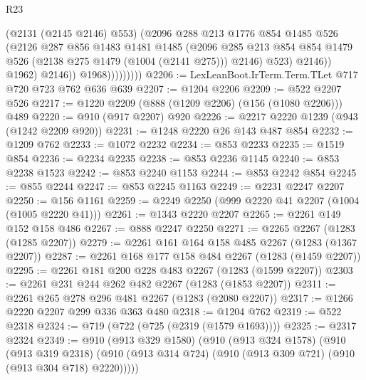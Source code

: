 \begin{lexlean}{R23}
\begin{coremodule}
                              (@2131 (@2145 @2146) @553)
                              (@2096
                                @288
                                @213
                                @1776
                                @854
                                @1485
                                @526
                                (@2126
                                  @287
                                  @856
                                  @1483
                                  @1481
                                  @1485
                                  (@2096
                                    @285
                                    @213
                                    @854
                                    @854
                                    @1479
                                    @526
                                    (@2138 @275 @1479 (@1004 (@2141 @275)))
                                    @2146)
                                  @523)
                                @2146))
                            @1962)
                          @2146))
                      @1968)))))))))
@2206 := LexLeanBoot.IrTerm.Term.TLet @717 @720 @723 @762 @636 @639
@2207 := @1204 @2206
@2209 := @522 @2207 @526
@2217 := @1220 @2209 (@888 (@1209 @2206) (@156 (@1080 @2206))) @489
@2220 := @910 (@917 @2207) @920
@2226 := @2217 @2220 @1239 (@943 (@1242 @2209 @920))
@2231 := @1248 @2220 @26 @143 @487 @854
@2232 := @1209 @762
@2233 := @1072 @2232
@2234 := @853 @2233
@2235 := @1519 @854
@2236 := @2234 @2235
@2238 := @853 @2236 @1145
@2240 := @853 @2238 @1523
@2242 := @853 @2240 @1153
@2244 := @853 @2242 @854
@2245 := @855 @2244
@2247 := @853 @2245 @1163
@2249 := @2231 @2247 @2207
@2250 := @156 @1161
@2259 := @2249 @2250 (@999 @2220 @41 @2207 (@1004 (@1005 @2220 @41)))
@2261 := @1343 @2220 @2207
@2265 := @2261 @149 @152 @158 @486
@2267 := @888 @2247 @2250
@2271 := @2265 @2267 (@1283 (@1285 @2207))
@2279 := @2261 @161 @164 @158 @485 @2267 (@1283 (@1367 @2207))
@2287 := @2261 @168 @177 @158 @484 @2267 (@1283 (@1459 @2207))
@2295 := @2261 @181 @200 @228 @483 @2267 (@1283 (@1599 @2207))
@2303 := @2261 @231 @244 @262 @482 @2267 (@1283 (@1853 @2207))
@2311 := @2261 @265 @278 @296 @481 @2267 (@1283 (@2080 @2207))
@2317 := @1266 @2220 @2207 @299 @336 @363 @480
@2318 := @1204 @762
@2319 := @522 @2318
@2324 := @719 (@722 (@725 (@2319 (@1579 @1693))))
@2325 := @2317 @2324
@2349 := @910
    (@913 @329 @1580)
    (@910
      (@913 @324 @1578)
      (@910
        (@913 @319 @2318)
        (@910 (@913 @314 @724) (@910 (@913 @309 @721) (@910 (@913 @304 @718) @2220)))))

\end{coremodule}
\end{lexlean}
